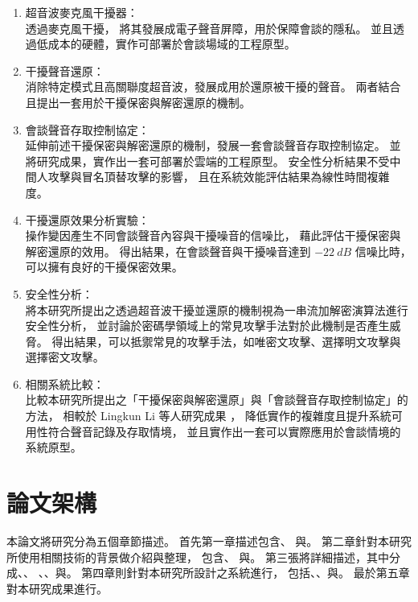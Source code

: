     \begin{enumerate}
        \item 超音波麥克風干擾器：\\
            透過麥克風干擾\cite{chen2020wearable}\cite{roy2017backdoor}，
        將其發展成電子聲音屏障，用於保障會談的隱私。
        並且透過低成本的硬體，實作可部署於會談場域的工程原型。

        \item 干擾聲音還原：\\
            消除特定模式且高關聯度超音波\cite{he2019canceling}，發展成用於還原被干擾的聲音。
        兩者結合且提出一套用於干擾保密與解密還原的機制。

        \item 會談聲音存取控制協定：\\
            延伸前述干擾保密與解密還原的機制，發展一套會談聲音存取控制協定。
        並將研究成果，實作出一套可部署於雲端的工程原型。
        安全性分析結果不受中間人攻擊與冒名頂替攻擊的影響，
        且在系統效能評估結果為線性時間複雜度。

        \item 干擾還原效果分析實驗：\\
            操作變因產生不同會談聲音內容與干擾噪音的信噪比，
        藉此評估干擾保密與解密還原的效用。
        得出結果，在會談聲音與干擾噪音達到 $-22~dB$ 信噪比時，可以擁有良好的干擾保密效果。

        \item 安全性分析：\\
            將本研究所提出之透過超音波干擾並還原的機制視為一串流加解密演算法進行安全性分析，
        並討論於密碼學領域上的常見攻擊手法對於此機制是否產生威脅。
        得出結果，可以抵禦常見的攻擊手法，如唯密文攻擊、選擇明文攻擊與選擇密文攻擊。

        \item 相關系統比較：\\
            比較本研究所提出之「干擾保密與解密還原」與「會談聲音存取控制協定」的方法，
        相較於 Lingkun Li 等人研究成果 \cite{li2020patronus}，
        降低實作的複雜度且提升系統可用性符合聲音記錄及存取情境，
        並且實作出一套可以實際應用於會談情境的系統原型。
    \end{enumerate}


\section{論文架構}\label{section:intro-arch}

    本論文將研究分為五個章節描述。
首先第一章描述包含、
與。
第二章針對本研究所使用相關技術的背景做介紹與整理，
包含、
與。
第三張將詳細描述，其中分成、、
、、與。
第四章則針對本研究所設計之系統進行，
包括、、與。
最於第五章對本研究成果進行。